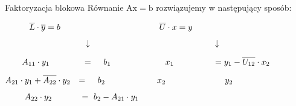 \begin{frame}{Faktoryzacja blokowa}
Równanie $\mathrm{A}\mathrm{x}=\mathrm{b}$ rozwiązujemy w następujący sposób:\\

\vspace{0.5cm}

$\hspace*{10mm} \overline{L}\cdot\overline{y}=b\  \hspace*{40mm}\overline{U}\cdot x=y$

$\hspace*{33.5mm}\downarrow\ \hspace*{51mm} \downarrow$

$\hspace*{7mm}A_{11}\cdot y_{1}\ \hspace*{12.4mm} =\ \hspace*{3mm} b_{1}\ \hspace*{21.5mm} x_{1}\ \hspace*{15mm} = y_{1}-\overline{U_{12}}\cdot x_{2}$

$A_{21}\cdot y_{1}+\overline{A_{22}}\cdot y_{2}\hspace*{2.5mm} =\ \hspace*{3mm} b_{2}\ \hspace*{20.5mm} x_{2}\ \hspace*{23.5mm} y_{2} $

$\hspace*{8mm} A_{22}\cdot y_{2} \hspace*{11.5mm} =\ b_{2}-A_{21}\cdot y_{1}\ $




\end{frame}